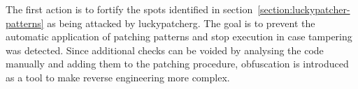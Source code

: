 The first action is to fortify the spots identified in section~\ref{section:luckypatcher-patterns} as being attacked by \gls{luckypatcherg}.
The goal is to prevent the automatic application of patching patterns and stop execution in case tampering was detected.
Since additional checks can be voided by analysing the code manually and adding them to the patching procedure, obfuscation is introduced as a tool to make reverse engineering more complex.
